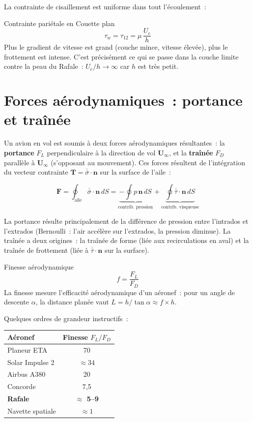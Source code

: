 \documentclass[11pt,a4paper]{report}
\newcommand{\ten}[1]{\overline{\overline{#1}}}   %
\begin{document}
La contrainte de cisaillement est uniforme dans tout l'écoulement~:

\begin{importantbox}{Contrainte pariétale en Couette plan}
\[
    \tau_w = \tau_{12} = \mu\,\frac{U_e}{h}
\]
Plus le gradient de vitesse est grand (couche mince, vitesse élevée), plus le
frottement est intense. C'est précisément ce qui se passe dans la couche limite
contre la peau du Rafale~: $U_e/h \to \infty$ car $h$ est très petit.
\end{importantbox}

\section{Forces aérodynamiques~: portance et traînée}

Un avion en vol est soumis à deux forces aérodynamiques résultantes~: la
\textbf{portance} $F_L$ perpendiculaire à la direction de vol $\bm{U}_\infty$, et la
\textbf{traînée} $F_D$ parallèle à $\bm{U}_\infty$ (s'opposant au mouvement).
Ces forces résultent de l'intégration du vecteur contrainte $\bm{T}=\ten{\sigma}\cdot\bm{n}$
sur la surface de l'aile~:

\[
    \bm{F} = \oint_{\text{aile}} \ten{\sigma}\cdot\bm{n}\,dS
    = \underbrace{-\oint p\,\bm{n}\,dS}_{\text{contrib.\ pression}}
      + \underbrace{\oint \ten{\tau}\cdot\bm{n}\,dS}_{\text{contrib.\ visqueuse}}
\]

La portance résulte principalement de la différence de pression entre l'intrados
et l'extrados (Bernoulli~: l'air accélère sur l'extrados, la pression diminue).
La traînée a deux origines~: la traînée de forme (liée aux recirculations en aval)
et la traînée de frottement (liée à $\ten{\tau}\cdot\bm{n}$ sur la surface).

\begin{defbox}{Finesse aérodynamique}
\[
    f = \frac{F_L}{F_D}
\]
La finesse mesure l'efficacité aérodynamique d'un aéronef~: pour un angle de
descente $\alpha$, la distance planée vaut $L = h/\tan\alpha \approx f \times h$.
\end{defbox}

\medskip
\noindent Quelques ordres de grandeur instructifs~:

\begin{center}
\renewcommand{\arraystretch}{1.3}
\begin{tabular}{lc}
\toprule
\textbf{Aéronef} & \textbf{Finesse} $F_L/F_D$ \\
\midrule
Planeur ETA & 70 \\
Solar Impulse 2 & $\approx 34$ \\
Airbus A380 & 20 \\
Concorde & 7{,}5 \\
\textbf{Rafale} & \textbf{$\approx$ 5--9} \\
Navette spatiale & $\approx 1$ \\
\bottomrule
\end{tabular}
\end{center}
\end{document}
